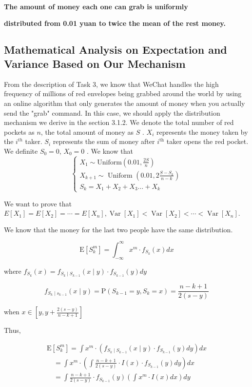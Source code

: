 \documentclass{scrartcl}
\begin{document}
\centerline{\textbf{The amount of money each one can grab is uniformly }}
\centerline{\textbf{distributed from 0.01 yuan to twice the mean of the rest money.}}
\subsection{Mathematical Analysis on Expectation and Variance Based on Our Mechanism}\label{sec3.1}
From the description of Task 3, we know that WeChat handles the high frequency of millions of red envelopes being grabbed around the world by using an online algorithm that only generates the amount of money when you actually send the "grab" command. In this case, we should apply the distribution mechanism we derive in the section 3.1.2. We denote the total number of red pockets as  $n$, the total amount of money as  $S$ \cite{bidaothuWoGeiZiJiFaLiao2YiGeHongBaoCaiFaXianXianQiangHeHouQiangChaiJuZheMeDaBiLiBiLi}. $X_{i}$  represents the money taken by  the $i^{t h}$  taker.  $S_{i}$  represents the sum of money after  $i^{\text{th}}$  taker opens the red pocket. We definite  $S_{0}=0$, $X_{0}=0$ . We know that
$$\left\{\begin{array}{c}
X_{1} \sim \text{Uniform}\left(0.01,\frac{2S}{n}\right) \\
X_{k+1} \sim \text { Uniform }\left(0.01,2 \frac{S-S_{k}}{n-k}\right) \\
S_{k}=X_{1}+X_{2}+X_{3} \ldots+X_{k}
\end{array}\right.$$\par
We want to prove that
$E\left[X_{1}\right]=E\left[X_{2}\right]=\cdots=E\left[X_{n}\right], \operatorname{Var}\left[X_{1}\right]<\operatorname{Var}\left[X_{2}\right]<\cdots<\operatorname{Var}\left[X_{n}\right]$.

We know that the money for the last two people have the same distribution.

$$\mathrm{E}\left[S_{k}^{m}\right]=\int_{-\infty}^{\infty} x^{m} \cdot f_{S_{k}}(x) d x$$

where  $f_{S_{k}}(x)=f_{S_{k} \mid S_{k-1}}(x \mid y) \cdot f_{S_{k-1}}(y) d y $

$$f_{S_{k} \mid s_{k-1}}(x \mid y)=\mathrm{P}\left(S_{k-1}=y, S_{k}=x\right)=\frac{n-k+1}{2(s-y)}$$

when  $x\in\left[y, y+\frac{2(s-y)}{n-k+1}\right] $\par
Thus,

$$\begin{array}{l}\mathrm{E}\left[S_{k}^{m}\right]
=\int x^{m} \cdot\left(f_{S_{k} \mid S_{k-1}}(x \mid y) \cdot f_{S_{k-1}}(y) d y\right) d x \\
\quad=\int x^{m} \cdot\left(\int \frac{n-k+1}{2(s-y)} \cdot I(x) \cdot f_{S_{k-1}}(y) d y\right) d x \\
\quad=\int \frac{n-k+1}{2(s-y)} \cdot f_{S_{k-1}}(y)\left(\int x^{m} \cdot I(x) d x\right) d y
\end{array}$$
\end{document}
